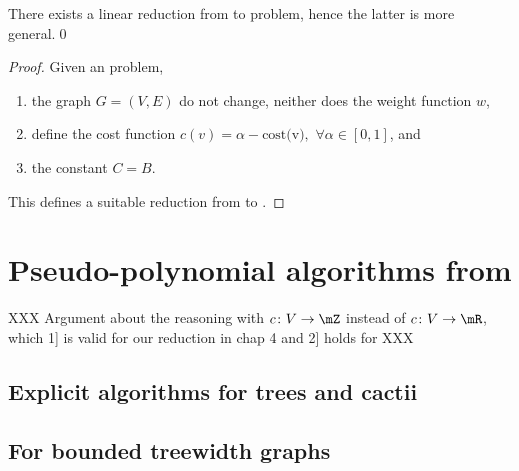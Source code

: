 		\begin{proposition}
			There exists a linear reduction from \bcmwcs{} to \rbmwcs{} problem, hence the latter is more general.\qed{}
		\end{proposition}

		\begin{proof}
			Given an \bcmwcs{} problem,
			\begin{enumerate}
				\item the graph $G = (V, E)$ do not change, neither does the weight function $w$,
				\item define the cost function $c(v) = \alpha - \text{cost(v)},\,\,\forall \alpha \in [0,1]$, and
				\item the constant $C = B$.
			\end{enumerate}
			This defines a suitable reduction from \bcmwcs{} to \rbmwcs{}.
		\end{proof}


	\section{Pseudo-polynomial algorithms from \mwcs{}}

		XXX Argument about the reasoning with $c\colon V \to \mZ$ instead of $c\colon V \to \mR$, which 1] is valid for our reduction in chap 4 and 2] holds for \bcmwcs{} XXX

		\subsection{Explicit algorithms for trees and cactii}

		\subsection{For bounded treewidth graphs}
